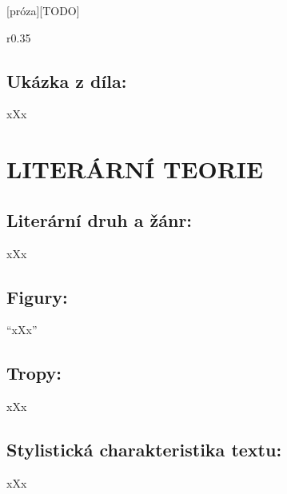 \documentclass{extarticle} %
\begin{document}

\newpage


\changefontsize{8pt}

[próza][TODO]

\noindent\begin{wrapfigure}{r}{0.35\textwidth}
\tiny

\subsection*{Ukázka z díla:}
\setlength{\parindent}{3pt}
xXx
\end{wrapfigure}

\section*{LITERÁRNÍ TEORIE}

\subsection*{Literární druh a žánr:}
\noindent xXx



\subsection*{Figury:}
\noindent 
\enquote{xXx}

\subsection*{Tropy:}
\noindent 
xXx

\subsection*{Stylistická charakteristika textu:}
\noindent 
xXx
\end{document}
